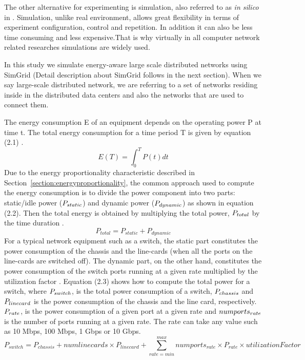 The other alternative for experimenting is simulation, also referred to as \emph{in silico} in \cite{DBLP:journals/jpdc/CasanovaGLQS14}. Simulation, unlike real environment, allows great flexibility in terms of experiment configuration, control and repetition. In addition it can also be less time consuming and less expensive.That is why virtually in all computer network related researches simulations are widely used. 

In this study we simulate energy-aware large scale distributed networks using SimGrid (Detail description about SimGrid follows in the next section). When we say large-scale distributed network, we are referring to a set of networks residing inside in the distributed data centers and also the networks that are used to connect them. 

The energy consumption E of an equipment depends on the operating power P at time t. The total energy consumption for a time period T is given by equation (2.1) \cite{DBLP:conf/wowmom/OrgerieLLL11}. 
\begin{equation}
  E(T) = \int_{0}^{T} P(t) dt
\end{equation} 
Due to the energy proportionality characteristic described in Section~\ref{section:energyproportionality}, the common approach used to compute the energy consumption is to divide the power component into two parts: static/idle power (\($$P_{static}$$\)) and dynamic power (\($$P_{dynamic}$$\)) as shown in equation (2.2). Then the total energy is obtained by multiplying the total power, \($$P_{total}$$\) by the time duration \cite{DBLP:conf/wowmom/OrgerieLLL11,DBLP:journals/tjs/KliazovichBK12,DBLP:conf/networking/MahadevanSBR09,DBLP:journals/comsur/DayarathnaWF16}. 
\begin{equation}
 P_{total} = P_{static} + P_{dynamic}
\end{equation} 
For a typical network equipment such as a switch, the static part constitutes the power consumption of the chassis and the line-cards (when all the ports on the line-cards are switched off). The dynamic part, on the other hand, constitutes the power consumption of the switch ports running at a given rate multiplied by the utilization factor \cite{DBLP:conf/networking/MahadevanSBR09}. Equation (2.3) shows how to compute the total power for a switch, where \($$P_{switch}$$\), is the total power consumption of a switch, \($$P_{chassis}$$\) and \($$P_{linecard}$$\) is the power consumption of the chassis and the line card, respectively. \($$P_{rate}$$\), is the power consumption of a given port at a given rate and \($$numports_{rate}$$\) is the number of ports running at a given rate. The rate can take any value such as 10 Mbps, 100 Mbps, 1 Gbps or 10 Gbps.
\begin{equation}
P_{switch} = P_{chassis} + numlinecards \times P_{linecard}  + \sum_{rate=min}^{max} numports_{rate} \times P_{rate} \times utilizationFactor
\end{equation}
